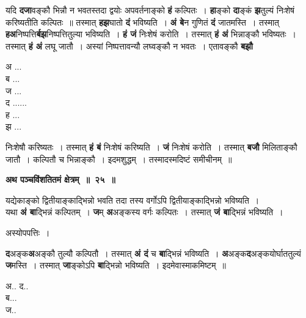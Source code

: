 \documentclass[11pt, openany]{book}
\begin{document}
\begin{flushleft}
\begin{minipage}[t]{0.75\textwidth}
\hspace{4mm} यदि \textbf{दजा}वङ्कौ भिन्नौ न भवतस्तदा द्वयोः अपवर्तनाङ्को \textbf{हं} कल्पितः~। \textbf{हा}ङ्को \textbf{दा}ङ्कं \textbf{झ}तुल्यं निःशेषं करिष्यतीति कल्पितः~॥ तस्मात् \textbf{हझ}घातो \textbf{दं} भविष्यति~। \textbf{अं बे}न गुणितं \textbf{दं} जातमस्ति~। तस्मात् \textbf{हअ}निष्पत्ति\textbf{र्बझ}निष्पत्तितुल्या भविष्यति~। \textbf{हं जं} निःशेषं करोति~। तस्मात् \textbf{हं अं} भिन्नाङ्कौ भविष्यतः~। तस्मात् \textbf{हं अं} लघू जातौ~। अस्यां निष्पत्तावन्यौ लघ्वङ्कौ न भवतः~। एतावङ्कौ \textbf{बझौ}
\end{minipage} 
\hfill
\begin{minipage}[t]{0.15\textwidth}
अ ... \\
ब ... \\
ज ... \\
द ......\\
ह ... \\
झ ...
\end{minipage}
\end{flushleft}
\vspace{-3mm}

\noindent निःशेषौ करिष्यतः~। तस्मात् \textbf{हं बं} निःशेषं करिष्यति~। \textbf{जं} निःशेषं करोति~। तस्मात् \textbf{बजौ} मिलिताङ्कौ जातौ~। कल्पितौ च भिन्नाङ्कौ~। इदमशुद्धम्~। तस्मादस्मदिष्टं समीचीनम्~॥ 
\vspace{2mm}

\begin{center}
\textbf{\large अथ पञ्चविंशतितमं क्षेत्रम्~॥~२५~॥}
\end{center}

{\ab यद्येकाङ्को द्वितीयाङ्काद्भिन्नो भवति तदा तस्य वर्गोऽपि द्वितीयाङ्काद्भिन्नो भविष्यति~। }\\

यथा \textbf{अं बा}द्भिन्नं कल्पितम्~। \textbf{ज}म् \textbf{अ}अङ्कस्य वर्गः कल्पितः~। तस्मात् \textbf{जं बा}द्भिन्नं भविष्यति~। 

\begin{center}
अस्योपपत्तिः~।
\end{center}

\begin{flushleft}
\begin{minipage}[t]{0.75\textwidth}
\hspace{4mm} \textbf{द}अङ्क\textbf{अ}अङ्कौ तुल्यौ कल्पितौ~। तस्मात् \textbf{अं दं} च \textbf{बा}द्भिन्नं भविष्यति~। \textbf{अ}अङ्क\textbf{द}अङ्कयोर्घाततुल्यं \textbf{ज}मस्ति~। तस्मात् \textbf{जा}ङ्कोऽपि \textbf{बा}द्भिन्नो भविष्यति~। इदमेवास्माकमिष्टम्~॥
\end{minipage} 
\hfill
\begin{minipage}[t]{0.15\textwidth}
अ.. द..\\
ब... \\
ज..
\end{minipage}
\end{flushleft}
\vspace{-1mm}
\end{document}
